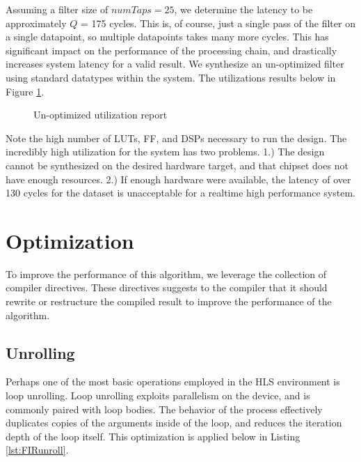 \documentclass[../report_polarFIR.tex]{subfiles}
\begin{document}
 Assuming a filter size of $numTaps = 25$, we determine the latency to be approximately $Q$ = 175 cycles. This is, of course, just a single pass of the filter on a single datapoint, so multiple datapoints takes many more cycles. This has significant impact on the performance of the processing chain, and drastically increases system latency for a valid result. We synthesize an un-optimized filter using standard  datatypes within the system. The utilizations results below in Figure \ref{fig:unoptimizedFIRutil}. 
 
 \begin{figure}[h!]
 	\begin{center}
 		\fboxsep=0mm
 		\caption{Un-optimized utilization report}
 		\label{fig:unoptimizedFIRutil}
 	\end{center}
 \end{figure}
 \FloatBarrier
 
 Note the high number of LUTs, FF, and DSPs necessary to run the design. The incredibly high utilization for the system has two problems. 1.) The design cannot be synthesized on the desired hardware target, and that chipset does not have enough resources. 2.) If enough hardware were available, the latency of over 130 cycles for the dataset is unacceptable for a realtime high performance system.
 
 \section{Optimization}
 To improve the performance of this algorithm, we leverage the  collection of compiler directives. These directives suggests to the compiler that it should rewrite or restructure the compiled result to improve the performance of the algorithm.
 
 \subsection{Unrolling}
Perhaps one of the most basic operations employed in the HLS environment is loop unrolling. Loop unrolling exploits parallelism on the device, and is commonly paired with  loop bodies. The behavior of the process effectively duplicates copies of the arguments inside of the loop, and reduces the iteration depth of the loop itself. This optimization is applied below in Listing \ref{lst:FIRunroll}.
\end{document}
